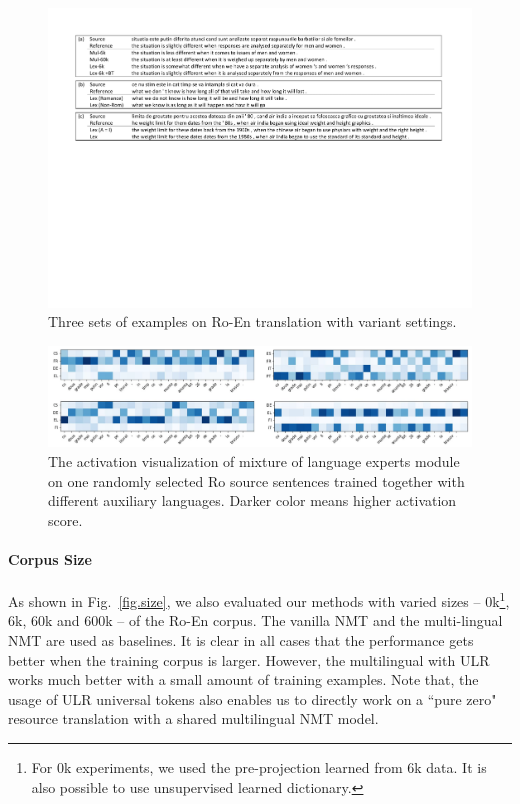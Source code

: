 \begin{figure}[t]
\centering
\includegraphics[width=\linewidth]{figs/ulr/examples1} \vspace{-10pt}
\caption{\label{fig.exp}Three sets of examples on Ro-En translation with variant settings. }
\end{figure}
\begin{figure}[t]
\centering
\includegraphics[width=\linewidth]{figs/ulr/vis2}\vspace{-10pt}
\caption{\label{fig.moe} The activation visualization of mixture of language experts module on one randomly selected Ro source sentences trained together with different auxiliary languages. Darker color means higher activation score. }
\end{figure}

\paragraph{Corpus Size}
As shown in Fig.~\ref{fig.size}, we also evaluated our methods with varied  sizes -- 0k\footnote{For 0k experiments, we used the pre-projection learned from 6k data. It is also possible to use unsupervised learned dictionary.}, 6k, 60k and 600k -- of the Ro-En corpus. The vanilla NMT and the multi-lingual NMT are used as baselines. It is clear in  all cases that the performance gets better when the training corpus is larger. However, the multilingual with ULR works much better with a small amount of training examples. Note that, the usage of ULR universal tokens also enables us to directly work on a ``pure zero" resource translation with a shared multilingual NMT model. 


